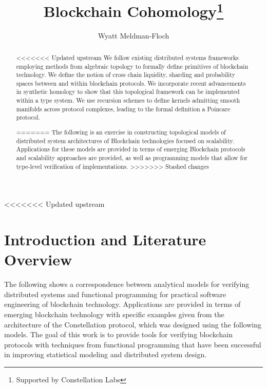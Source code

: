 \documentclass[runningheads]{llncs}
\begin{document}
%
\title{Blockchain Cohomology\thanks{Supported by Constellation Labs}}
%
%
\author{Wyatt Meldman-Floch }
%
%
%
\maketitle              %
%
\begin{abstract}
<<<<<<< Updated upstream
We follow existing distributed systems frameworks employing methods from algebraic topology to formally define primitives of blockchain technology. We define the notion of cross chain liquidity, sharding and probability spaces between and within blockchain protocols. We incorporate recent advancements in synthetic homology to show that this topological framework can be implemented within a type system. We use recursion schemes to define kernels admitting smooth manifolds across protocol complexes, leading to the formal definition a Poincare protocol.

=======
The following is an exercise in constructing topological models of distributed system architectures of Blockchain technologies focused on scalability. Applications for these models are provided in terms of emerging Blockchain protocols and scalability approaches are provided, as well as programming models that allow for type-level verification of implementations.
>>>>>>> Stashed changes
\end{abstract}
%
%
%
<<<<<<< Updated upstream
\section{Introduction and Literature Overview}
The following shows a correspondence between analytical models for verifying distributed systems and functional programming for practical software engineering of blockchain technology. Applications are provided in terms of emerging blockchain technology with specific examples given from the architecture of the Constellation protocol, which was designed using the following models. The goal of this work is to provide tools for verifying blockchain protocols with techniques from functional programming that have been successful in improving statistical modeling and distributed system design.
\end{document}
